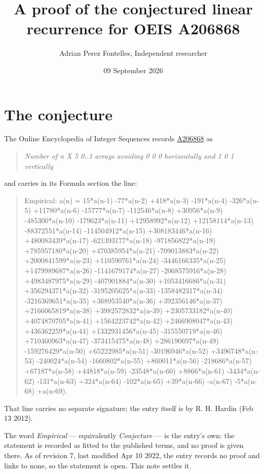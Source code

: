 \documentclass[11pt]{article}
\title{A proof of the conjectured linear recurrence for OEIS A206868}
\author{Adrian Perez Fontelles, Independent researcher}
\date{09 September 2026}
\theoremstyle{definition}
\begin{document}
\maketitle
\section{The conjecture}

The Online Encyclopedia of Integer Sequences records \href{https://oeis.org/A206868}{A206868} as

\begin{quote}\itshape Number of n X 5 0..1 arrays avoiding 0 0 0 horizontally and 1 0 1 vertically\end{quote}

and carries in its Formula section the line:

\begin{quote}\ttfamily Empirical: a(n) = 15*a(n-1) -77*a(n-2) +418*a(n-3) -191*a(n-4) -326*a(n-5) +11780*a(n-6) -15777*a(n-7) -112546*a(n-8) +30956*a(n-9) -485300*a(n-10) -179623*a(n-11) +12958992*a(n-12) +12158114*a(n-13) -88372551*a(n-14) -114504912*a(n-15) +308183446*a(n-16) +480083439*a(n-17) -621393177*a(n-18) -971856822*a(n-19) +785957180*a(n-20) +470385954*a(n-21) -709013883*a(n-22) +2000841599*a(n-23) +110590761*a(n-24) -3446166335*a(n-25) +1479989687*a(n-26) -1141679174*a(n-27) -2068575916*a(n-28) +4983487975*a(n-29) -407901884*a(n-30) +1053416686*a(n-31) +356294371*a(n-32) -3195205625*a(n-33) -1358482317*a(n-34) -3216369651*a(n-35) +368953540*a(n-36) +392356146*a(n-37) +2166065819*a(n-38) +3982572832*a(n-39) +2305733182*a(n-40) +4074870705*a(n-41) +1564223742*a(n-42) +2466908047*a(n-43) +436362259*a(n-44) +1332931456*a(n-45) -315550719*a(n-46) +710460963*a(n-47) -373415475*a(n-48) +286190697*a(n-49) -159276429*a(n-50) +65222985*a(n-51) -30196946*a(n-52) +3496748*a(n-53) -240024*a(n-54) -1660802*a(n-55) +860011*a(n-56) -218686*a(n-57) +67187*a(n-58) +44818*a(n-59) -23548*a(n-60) +8866*a(n-61) -3434*a(n-62) -131*a(n-63) +324*a(n-64) -102*a(n-65) +39*a(n-66) -a(n-67) -5*a(n-68) +a(n-69).\end{quote}

That line carries no separate signature; the entry itself is by R. H. Hardin (Feb 13 2012).

The word {\itshape Empirical} --- equivalently {\itshape Conjecture} --- is the entry's own: the statement is recorded as fitted to the published terms, and no proof is given there. As of revision 7, last modified Apr 10 2022, the entry records no proof and links to none, so the statement is open. This note settles it.
\end{document}
